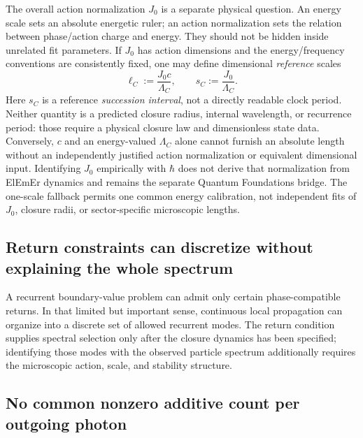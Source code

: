 \documentclass[11pt]{article}
\theoremstyle{definition}
\begin{document}
The overall action normalization $J_0$ is a separate physical question.  An energy scale
sets an absolute energetic ruler; an action normalization sets the relation between
phase/action charge and energy.  They should not be hidden inside unrelated fit
parameters.  If $J_0$ has action dimensions and the energy/frequency conventions are
consistently fixed, one may define dimensional \emph{reference} scales
\begin{equation}
 \ell_C:=\frac{J_0c}{\Lambda_C},\qquad
 s_C:=\frac{J_0}{\Lambda_C}.
 \label{eq:scale_reference_dimensions}
\end{equation}
Here $s_C$ is a reference \emph{succession interval}, not a directly readable clock
period.  Neither quantity is a predicted closure radius, internal wavelength, or
recurrence period: those require a physical closure law and dimensionless state data.
Conversely, $c$ and an energy-valued $\Lambda_C$ alone cannot furnish an absolute length
without an independently justified action normalization or equivalent dimensional
input.  Identifying $J_0$ empirically with $\hbar$ does not derive that normalization
from ElEmEr dynamics and remains the separate Quantum Foundations bridge.  The
one-scale fallback permits one common energy calibration, not independent fits of
$J_0$, closure radii, or sector-specific microscopic lengths.

\subsection{Return constraints can discretize without explaining the whole spectrum}
\label{subsec:return_discreteness}

A recurrent boundary-value problem can admit only certain phase-compatible returns.  In
that limited but important sense, continuous local propagation can organize into a
discrete set of allowed recurrent modes.  The return condition supplies spectral
selection only after the closure dynamics has been specified; identifying those modes
with the observed particle spectrum additionally requires the microscopic action, scale,
and stability structure.

\subsection{No common nonzero additive count per outgoing photon}
\label{subsec:additive_no_go}
\end{document}
